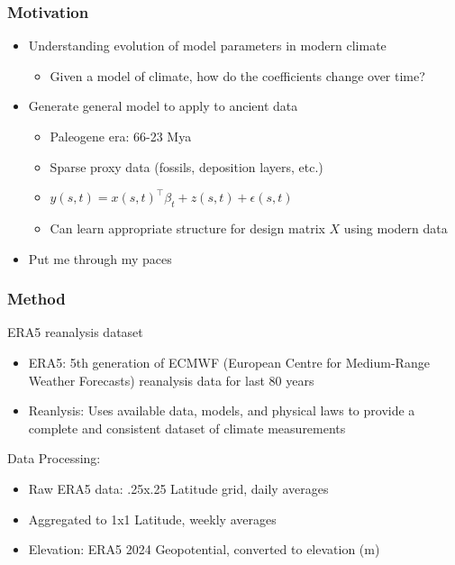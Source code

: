 \documentclass{beamer}
\begin{document}
    \begin{frame}
        \frametitle{Motivation}
        \begin{itemize}
            \item Understanding evolution of model parameters in modern climate
            \begin{itemize}
                \item Given a model of climate, how do the coefficients change over time?
            \end{itemize}
            \item Generate general model to apply to ancient data
                \begin{itemize}
                    \item Paleogene era: 66-23 Mya
                    \item Sparse proxy data (fossils, deposition layers, etc.)
                    \item $y(s, t) = x(s, t)^{\top}\beta_t + z(s, t) + \epsilon(s, t)$
                    \item Can learn appropriate structure for design matrix $X$ using modern data
                \end{itemize} 
            \item Put me through my paces
        \end{itemize} 
    \end{frame}

    \begin{frame}
        \frametitle{Method}
        ERA5 reanalysis dataset 
            \begin{itemize}
                \item ERA5: 5th generation of ECMWF (European Centre for Medium-Range Weather Forecasts) reanalysis data for last 80 years \cite{CopernicusERA5}
                \item Reanlysis: Uses available data, models, and physical laws to provide a complete and consistent dataset of climate measurements  \cite{CopernicusERA5}
            \end{itemize}

        Data Processing:
        \begin{itemize}
            \item Raw ERA5 data: .25x.25 Latitude grid, daily averages
            \item Aggregated to 1x1 Latitude, weekly averages
            \item Elevation: ERA5 2024 Geopotential, converted to elevation (m)
        \end{itemize} 
    \end{frame}
\end{document}
